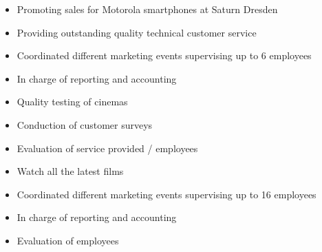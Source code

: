 \documentclass[10pt,a4paper]{altacv}
\begin{document}

\begin{itemize}
\item Promoting sales for Motorola smartphones at Saturn Dresden 
\item Providing outstanding quality technical customer service \faThumbsOUp
\end{itemize}

\divider

\begin{itemize}
\item Coordinated different marketing events supervising up to 6 employees
\item In charge of reporting and accounting
\end{itemize}

\divider

\begin{itemize}
\item Quality testing of cinemas
\item Conduction of customer surveys
\item Evaluation of service provided / employees
\item Watch all the latest films  \faFilm
\end{itemize}

\divider

\begin{itemize}
\item Coordinated different marketing events supervising up to 16 employees
\item In charge of reporting and accounting
\item Evaluation of employees
\end{itemize}



\clearpage







\end{document}
